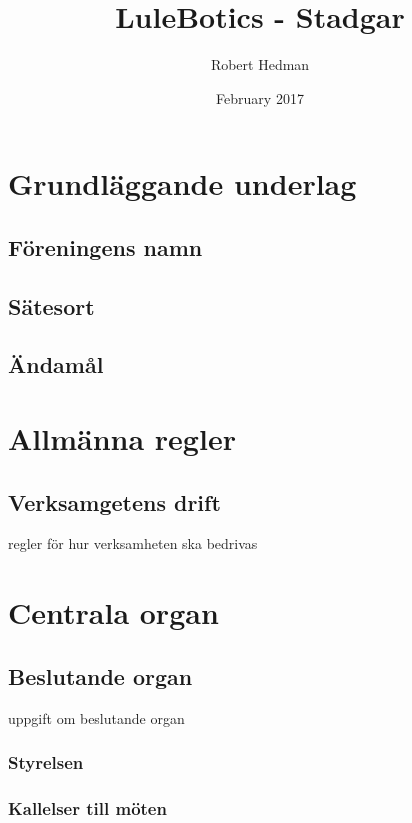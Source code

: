 \documentclass{article}
\title{LuleBotics - Stadgar}
\author{Robert Hedman}
\date{February 2017}
\begin{document}
\maketitle

\newpage

\tableofcontents

\newpage

\section{Grundläggande underlag}

\subsection{Föreningens namn}

\subsection{Sätesort}

\subsection{Ändamål}


\section{Allmänna regler}

\subsection{Verksamgetens drift}
regler för hur verksamheten ska bedrivas 



\section{Centrala organ}
\subsection{Beslutande organ}
uppgift om beslutande organ 
\subsubsection{Styrelsen}
\subsubsection{Kallelser till möten}
\end{document}
